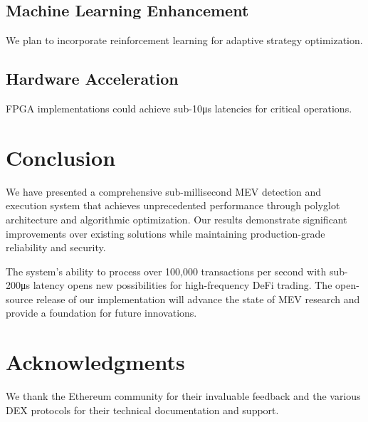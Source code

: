 \documentclass[12pt]{article}
\begin{document}
\subsection{Machine Learning Enhancement}
We plan to incorporate reinforcement learning for adaptive strategy optimization.

\subsection{Hardware Acceleration}
FPGA implementations could achieve sub-10μs latencies for critical operations.

\section{Conclusion}

We have presented a comprehensive sub-millisecond MEV detection and execution system that achieves unprecedented performance through polyglot architecture and algorithmic optimization. Our results demonstrate significant improvements over existing solutions while maintaining production-grade reliability and security.

The system's ability to process over 100,000 transactions per second with sub-200μs latency opens new possibilities for high-frequency DeFi trading. The open-source release of our implementation will advance the state of MEV research and provide a foundation for future innovations.

\section{Acknowledgments}

We thank the Ethereum community for their invaluable feedback and the various DEX protocols for their technical documentation and support.
\end{document}
